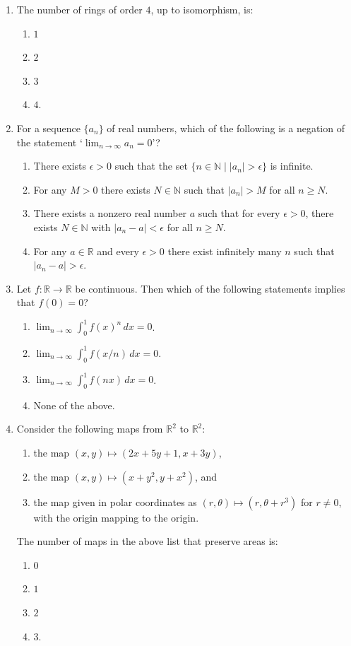 \documentclass[11pt, a4paper]{article}
\begin{document}
\begin{enumerate}
  \item The number of rings of order $4$, up to isomorphism, is:
  \begin{enumerate}[label=(\alph*)]
    \item $1$
    \item $2$
    \item $3$
    \item $4$.
  \end{enumerate}

  \item For a sequence $\{a_n\}$ of real numbers, which of the following is a negation of the statement `$\lim_{n \to \infty} a_n = 0$'?
  \begin{enumerate}[label=(\alph*)]
    \item There exists $\epsilon > 0$ such that the set $\{n \in \mathbb{N} \mid |a_n| > \epsilon\}$ is infinite.
    \item For any $M > 0$ there exists $N \in \mathbb{N}$ such that $|a_n| > M$ for all $n \ge N$.
    \item There exists a nonzero real number $a$ such that for every $\epsilon > 0$, there exists $N \in \mathbb{N}$ with $|a_n - a| < \epsilon$ for all $n \ge N$.
    \item For any $a \in \mathbb{R}$ and every $\epsilon > 0$ there exist infinitely many $n$ such that $|a_n - a| > \epsilon$.
  \end{enumerate}

  \item Let $f: \mathbb{R} \to \mathbb{R}$ be continuous. Then which of the following statements implies that $f(0) = 0$?
  \begin{enumerate}[label=(\alph*)]
    \item $\lim_{n \to \infty} \int_0^1 f(x)^n\,dx = 0$.
    \item $\lim_{n \to \infty} \int_0^1 f(x/n)\,dx = 0$.
    \item $\lim_{n \to \infty} \int_0^1 f(nx)\,dx = 0$.
    \item None of the above.
  \end{enumerate}

  \item Consider the following maps from $\mathbb{R}^2$ to $\mathbb{R}^2$:
  \begin{enumerate}[label=(\roman*)]
    \item the map $(x, y) \mapsto (2x + 5y + 1, x + 3y)$,
    \item the map $(x, y) \mapsto (x + y^2, y + x^2)$, and
    \item the map given in polar coordinates as $(r, \theta) \mapsto (r, \theta + r^3)$ for $r \ne 0$, with the origin mapping to the origin.
  \end{enumerate}
  The number of maps in the above list that preserve areas is:
  \begin{enumerate}[label=(\alph*)]
    \item $0$
    \item $1$
    \item $2$
    \item $3$.
  \end{enumerate}
\end{enumerate}
\end{document}
